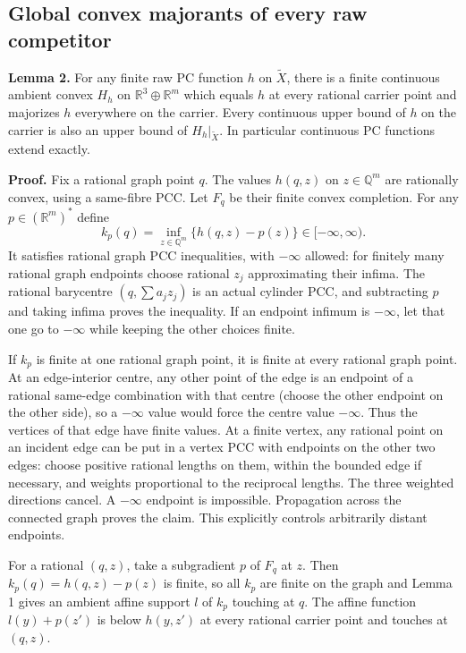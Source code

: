 \documentclass[
  11pt,
]{article}
\begin{document}
\subsection{Global convex majorants of every raw
competitor}\label{global-convex-majorants-of-every-raw-competitor}

\textbf{Lemma 2.} For any finite raw PC function \(h\) on
\(\widetilde X\), there is a finite continuous ambient convex \(H_h\) on
\(\mathbb R^3\oplus\mathbb R^m\) which equals \(h\) at every rational
carrier point and majorizes \(h\) everywhere on the carrier. Every
continuous upper bound of \(h\) on the carrier is also an upper bound of
\(H_h|_{\widetilde X}\). In particular continuous PC functions extend
exactly.

\textbf{Proof.} Fix a rational graph point \(q\). The values \(h(q,z)\)
on \(z\in\mathbb Q^m\) are rationally convex, using a same-fibre PCC.
Let \(F_q\) be their finite convex completion. For any
\(p\in(\mathbb R^m)^*\) define \[
k_p(q)=\inf_{z\in\mathbb Q^m}\{h(q,z)-p(z)\}\in[-\infty,\infty).
\tag{L1}
\] It satisfies rational graph PCC inequalities, with \(-\infty\)
allowed: for finitely many rational graph endpoints choose rational
\(z_j\) approximating their infima. The rational barycentre
\((q,\sum a_jz_j)\) is an actual cylinder PCC, and subtracting \(p\) and
taking infima proves the inequality. If an endpoint infimum is
\(-\infty\), let that one go to \(-\infty\) while keeping the other
choices finite.

If \(k_p\) is finite at one rational graph point, it is finite at every
rational graph point. At an edge-interior centre, any other point of the
edge is an endpoint of a rational same-edge combination with that centre
(choose the other endpoint on the other side), so a \(-\infty\) value
would force the centre value \(-\infty\). Thus the vertices of that edge
have finite values. At a finite vertex, any rational point on an
incident edge can be put in a vertex PCC with endpoints on the other two
edges: choose positive rational lengths on them, within the bounded edge
if necessary, and weights proportional to the reciprocal lengths. The
three weighted directions cancel. A \(-\infty\) endpoint is impossible.
Propagation across the connected graph proves the claim. This explicitly
controls arbitrarily distant endpoints.

For a rational \((q,z)\), take a subgradient \(p\) of \(F_q\) at \(z\).
Then \(k_p(q)=h(q,z)-p(z)\) is finite, so all \(k_p\) are finite on the
graph and Lemma 1 gives an ambient affine support \(l\) of \(k_p\)
touching at \(q\). The affine function \(l(y)+p(z')\) is below
\(h(y,z')\) at every rational carrier point and touches at \((q,z)\).
\end{document}
